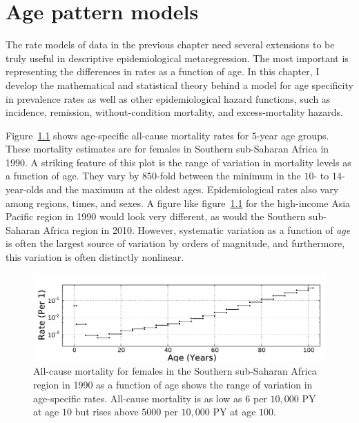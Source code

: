 \chapter{Age pattern models}
\label{theory-age_pattern_model}
The rate models of data in the previous chapter need several
extensions to be truly useful in descriptive epidemiological
metaregression.  The most important is representing the differences in
rates as a function of age.  In this chapter, I develop the
mathematical and statistical theory behind a model for age specificity
in prevalence rates as well as other epidemiological hazard functions,
such as incidence, remission, without-condition mortality, and
excess-mortality hazards.

Figure~\ref{ssas-mx_female_1990} shows age-specific all-cause
mortality rates for $5$-year age groups.  These mortality estimates are
for females in Southern sub-Saharan Africa in 1990.  A striking
feature of this plot is the range of variation in mortality levels as
a function of age.  They vary by $850$-fold between the minimum
in the $10$- to $14$-year-olds and the maximum at the oldest
ages. Epidemiological rates also vary among regions, times, and
sexes.  A figure like figure~\ref{ssas-mx_female_1990} for the high-income Asia Pacific
region in 1990 would look very different, as
would the Southern sub-Saharan Africa region in 2010. However,
systematic variation as a function of \emph{age} is often the largest
source of variation by orders of magnitude, and furthermore, this
variation is often distinctly nonlinear.

\begin{figure}[h]
\begin{center}
\includegraphics[width=\textwidth]{ssas-mx_female_1990.pdf}
\caption[All-cause mortality as a function of age.]{All-cause mortality for
  females in the Southern sub-Saharan Africa
  region in 1990 as a function of age shows the range of
  variation in age-specific rates.  All-cause mortality is as low as $6$ per
  $10,000$ PY at age $10$ but rises above $5000$ per $10,000$ PY at age $100$.}
\label{ssas-mx_female_1990}
\end{center}
\end{figure}

